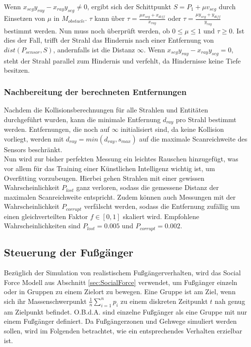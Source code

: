 Wenn $x_{seg} y_{ray} - x_{ray} y_{seg} \neq 0$, ergibt sich der Schittpunkt
$S = P_1 + \mu v_{seg}$ durch Einsetzen von $\mu$ in $M_{obstacle}$.
$\tau$ kann über $\tau = \frac{\mu x_{seg} + x_{diff}}{x_{ray}}$ oder
$\tau = \frac{\mu y_{seg} + y_{diff}}{y_{ray}}$ bestimmt werden.
Nun muss noch überprüft werden, ob $0 \le \mu \le 1$ und $\tau \ge 0$. Ist dies der Fall,
trifft der Strahl das Hindernis nach einer Entfernung von $dist(P_{sensor}, S)$,
andernfalls ist die Distanz $\infty$.
Wenn $x_{seg} y_{ray} - x_{ray} y_{seg} = 0$, steht der Strahl parallel zum Hindernis
und verfehlt, da Hindernisse keine Tiefe besitzen.

\subsubsection{Nachbereitung der berechneten Entfernungen}
Nachdem die Kollisionsberechnungen für alle Strahlen und Entitäten durchgeführt wurden,
kann die minimale Entfernung $d_{ray}$ pro Strahl bestimmt werden.
Entfernungen, die noch auf $\infty$ initialisiert sind, da keine Kollision vorliegt,
werden mit $d_{ray} = min(d_{ray}, s_{max})$ auf die maximale Scanreichweite
des Sensors beschränkt.\\

Nun wird zur bisher perfekten Messung ein leichtes Rauschen hinzugefügt, was vor allem
für das Training einer Künstlichen Intelligenz wichtig ist, um Overfitting vorzubeugen.
Hierbei gehen Strahlen mit einer gewissen Wahrscheinlichkeit $P_{lost}$ ganz verloren,
sodass die gemessene Distanz der maximalen Scanreichweite entspricht.
Zudem können auch Messungen mit der Wahrscheinlichkeit $P_{corrupt}$ verfälscht werden,
sodass die Entfernung zufällig um einen gleichverteilten Faktor $f \in [0, 1]$
skaliert wird. Empfohlene Wahrscheinlichkeiten sind $P_{lost} = 0.005$
und $P_{corrupt} = 0.002$.

\subsection{Steuerung der Fußgänger}
Bezüglich der Simulation von realistischem Fußgängerverhalten, wird das Social Force Modell
aus Abschnitt \ref{sec:SocialForce} verwendet, um Fußgänger einzeln oder in Gruppen zu einem
Zielort zu bewegen.
Eine Gruppe ist am Ziel, wenn sich ihr Massenschwerpunkt $\frac{1}{n} \sum_{i=1}^n p_i$
zu einem diskreten Zeitpunkt $t$ nah genug am Zielpunkt befindet. O.B.d.A. sind einzelne
Fußgänger als eine Gruppe mit nur einem Fußgänger definiert. Da Fußgängerzonen und Gehwege
simuliert werden sollen, wird im Folgenden betrachtet, wie ein entsprechendes Verhalten
erzielbar ist.\\

